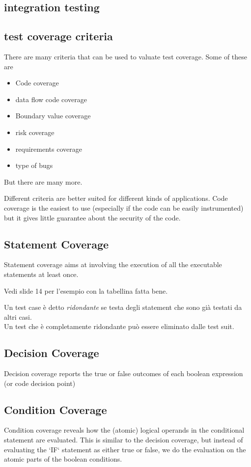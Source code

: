 \documentclass{article}
\begin{document}
\subsection{integration testing}

\subsection{test coverage criteria}
There are many criteria that can be used to valuate test coverage. Some of these are
\begin{itemize}
    \item Code coverage
    \item data flow code coverage
    \item Boundary value coverage
    \item risk coverage
    \item requirements coverage
    \item type of bugs
\end{itemize}
But there are many more.

Different criteria are better suited for different kinds of applications. Code coverage is the easiest to use (especially if the code can be easily instrumented) but it gives little guarantee about the security of the code.

\subsection{Statement Coverage}
Statement coverage aims at involving the execution of all the executable statements at least once.
\begin{callout}{}
    Vedi slide 14 per l'esempio con la tabellina fatta bene.
\end{callout}

Un test case è detto \textit{ridondante} se testa degli statement che sono già testati da altri casi.\\
Un test che è completamente ridondante può essere eliminato dalle test suit.

\subsection{Decision Coverage}
Decision coverage reports the true or false outcomes of each boolean expression (or code decision point)

\subsection{Condition Coverage}
Condition coverage reveals how the (atomic) logical operands in the conditional statement are evaluated. This is similar to the decision coverage, but instead of evaluating the `IF` statement as either true or false, we do the evaluation on the atomic parts of the boolean conditions.
\end{document}
